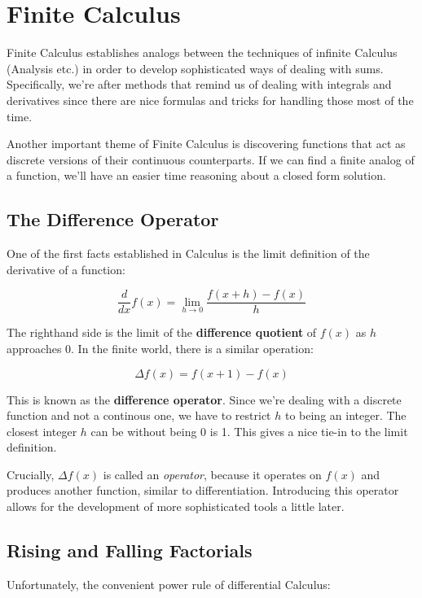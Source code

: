 \documentclass{standalone}
\begin{document}
\section{Finite Calculus}

Finite Calculus establishes analogs between the techniques of infinite Calculus
(Analysis etc.) in order to develop sophisticated ways of dealing with sums.
Specifically, we're after methods that remind us of dealing with integrals and
derivatives since there are nice formulas and tricks for handling those most of
the time.

Another important theme of Finite Calculus is discovering functions that act as
discrete versions of their continuous counterparts. If we can find a finite
analog of a function, we'll have an easier time reasoning about a closed form
solution.

\subsection{The Difference Operator}

One of the first facts established in Calculus is the limit definition of the
derivative of a function:

\[
  \frac d {dx} f(x) = \lim_{h \to 0} \frac {f(x + h) - f(x)} h
\]

The righthand side is the limit of the \textbf{difference quotient} of $f(x)$
as $h$ approaches 0. In the finite world, there is a similar operation:

\begin{equation*}
  \Delta f(x) = f(x + 1) - f(x)
\end{equation*}

This is known as the \textbf{difference operator}. Since we're dealing with a
discrete function and not a continous one, we have to restrict $h$ to being an
integer. The closest integer $h$ can be without being 0 is 1. This gives a nice
tie-in to the limit definition.

Crucially, $\Delta f(x)$ is called an \emph{operator}, because it operates on
$f(x)$ and produces another function, similar to differentiation. Introducing
this operator allows for the development of more sophisticated tools a little
later.

\subsection{Rising and Falling Factorials}

Unfortunately, the convenient power rule of differential Calculus:
\end{document}
